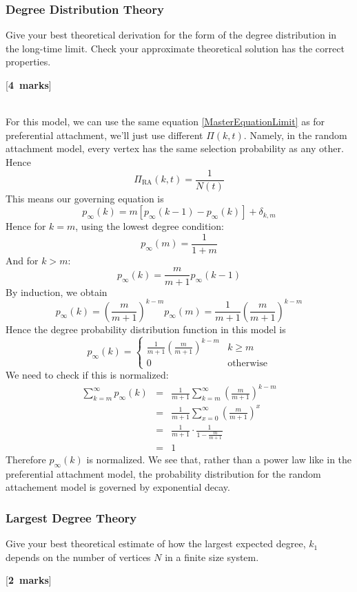 \documentclass[a4paper,12pt]{article}
\newcounter{nmarks}
\newcommand{\qmarks}[1]{\addtocounter{nmarks}{#1} }
\renewcommand{\qmarks}[1]{\addtocounter{nmarks}{#1} \hspace*{\fill} [\textbf{#1~marks}]}
\begin{document}
\subsubsection{Degree Distribution Theory}
Give your best theoretical derivation for the form of the degree distribution in the long-time limit. Check your approximate theoretical solution has the correct properties. \qmarks{4}

\hfill\\
For this model, we can use the same equation \ref{MasterEquationLimit} as for preferential attachment, we'll just use different $\Pi(k,t)$. Namely, in the random attachment model, every vertex has the same selection probability as any other. Hence
$$\Pi_{\mathrm{RA}}(k,t)=\frac{1}{N(t)}$$
This means our governing equation is
\begin{equation} \label{MasterEquationLimitRA}
p_\infty(k)= m\left[ p_\infty(k-1)-p_\infty(k) \right] + \delta_{k,m}
\end{equation}
Hence for $k=m$, using the lowest degree condition:
$$p_\infty(m)=\frac{1}{1+m}$$
And for $k>m$:
$$p_\infty(k)=\frac{m}{m+1}p_\infty(k-1)$$
By induction, we obtain
$$p_\infty(k)=\left(\frac{m}{m+1}\right)^{k-m}p_\infty(m)=\frac{1}{m+1}\left(\frac{m}{m+1}\right)^{k-m}$$
Hence the degree probability distribution function in this model is
\begin{equation} \label{RAprob}
p_\infty(k)=\begin{cases}
\frac{1}{m+1}\left(\frac{m}{m+1}\right)^{k-m} & k\geq m\\
0 & \mathrm{otherwise}
\end{cases}
\end{equation}
We need to check if this is normalized:
\begin{eqnarray*}
\sum_{k=m}^\infty p_\infty(k)&=&\frac{1}{m+1} \sum_{k=m}^\infty \left(\frac{m}{m+1}\right)^{k-m}\\
&=&\frac{1}{m+1} \sum_{x=0}^\infty \left(\frac{m}{m+1}\right)^x\\
&=&\frac{1}{m+1} \cdot \frac{1}{1-\frac{m}{m+1}}\\
&=& 1
\end{eqnarray*}
Therefore $p_\infty(k)$ is normalized. We see that, rather than a power law like in the preferential attachment model, the probability distribution for the random attachement model is governed by exponential decay.

\subsubsection{Largest Degree Theory}
Give your best theoretical estimate of how the largest expected degree, $k_\mathrm{1}$ 
depends on the number of vertices $N$ in a finite size system. \qmarks{2}
\end{document}
